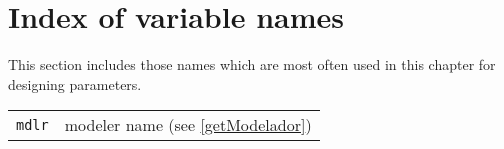 \section{Index of variable names}
This section includes those names which are most often used in this chapter for designing parameters. 
\begin{center}
\begin{tabular}{lp{10cm}}
{\tt mdlr} & modeler name (see \ref{getModelador})\\


\end{tabular}
\end{center}
